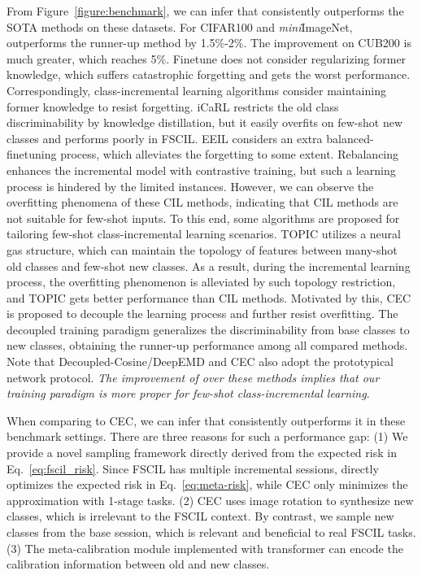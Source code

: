 From Figure~\ref{figure:benchmark}, we can infer that \name consistently outperforms the SOTA methods on these datasets. For CIFAR100 and \textit{mini}ImageNet, \name outperforms the runner-up method by 1.5\%-2\%. The improvement on CUB200 is much greater, which reaches 5\%. Finetune does not consider regularizing former knowledge, which suffers catastrophic forgetting and gets the worst performance. Correspondingly, class-incremental learning algorithms consider maintaining former knowledge to resist forgetting. iCaRL restricts the old class discriminability by knowledge distillation, but it easily overfits on few-shot new classes and performs poorly in FSCIL. 
EEIL considers an extra balanced-finetuning process, which alleviates the forgetting to some extent. Rebalancing enhances the incremental model with contrastive training, but such a learning process is hindered by the limited instances. However, we can observe the overfitting phenomena of these CIL methods, indicating that CIL methods are not suitable for few-shot inputs. 
To this end, some algorithms are proposed for tailoring few-shot class-incremental learning scenarios. TOPIC utilizes a neural gas structure, which can maintain the topology of features between many-shot old classes and few-shot new classes. As a result, during the incremental learning process, the overfitting phenomenon is alleviated by such topology restriction, and TOPIC gets better performance than CIL methods. Motivated by this, CEC is proposed to decouple the learning process and further resist overfitting. The decoupled training paradigm generalizes the discriminability from base classes to new classes, obtaining the runner-up performance among all compared methods. Note that Decoupled-Cosine/DeepEMD and CEC also adopt the prototypical network protocol. \emph{The improvement of \name over these methods implies that our training paradigm is more proper for few-shot class-incremental learning}.




 When comparing \name to CEC, we can infer that \name consistently outperforms it in these benchmark settings. There are three reasons for such a performance gap: (1) We provide a novel sampling framework directly derived from the expected risk in Eq.~\ref{eq:fscil_risk}. Since FSCIL has multiple incremental sessions, \name directly optimizes the expected risk in Eq.~\ref{eq:meta-risk}, while CEC only minimizes the approximation with 1-stage tasks. (2) CEC uses image rotation to synthesize new classes, which is irrelevant to the FSCIL context. By contrast, we sample new classes from the base session, which is relevant and beneficial to real FSCIL tasks. (3) The meta-calibration module implemented with transformer can encode the calibration information between old and new classes.




